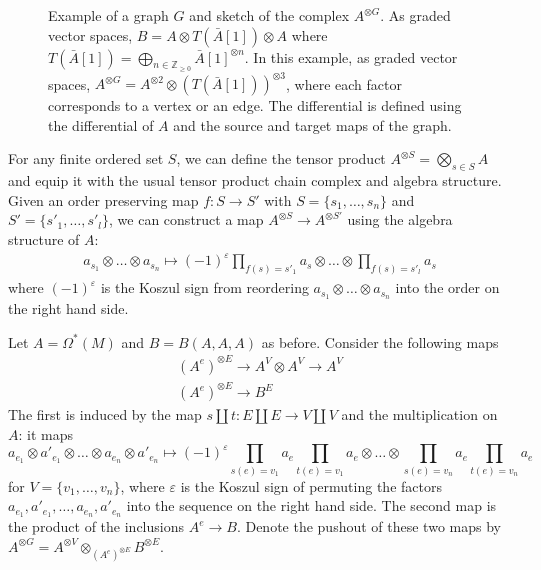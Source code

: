 \documentclass{scrartcl}
\theoremstyle{plain}
\theoremstyle{definition}
\newcommand{\Z}{\mathbb Z}
\renewcommand{\epsilon}{\varepsilon}
\renewcommand{\coprod}{\mathbin{\amalg}}
\newcommand{\Prod}{\prod}
\begin{document}
\begin{figure}[h]
    \center
    \caption{Example of a graph $G$ and sketch of the complex $A^{\otimes G}$. As graded vector spaces, $B = A\otimes T(\bar A[1])\otimes A$ where $T(\bar A[1]) = \bigoplus_{n\in \Z_{\geq 0}} \bar A[1]^{\otimes n}$. In this example, as graded vector spaces, $A^{\otimes G} = A^{\otimes 2} \otimes (T(\bar A[1]))^{\otimes 3}$, where each factor corresponds to a vertex or an edge. The differential is defined using the differential of $A$ and the source and target maps of the graph. }\label{fig:graph-model-example}
\end{figure}

For any finite ordered set $S$, we can define the tensor product $A^{\otimes S} = \bigotimes_{s\in S} A$ and equip it with the usual tensor product chain complex and algebra structure. Given an order preserving map $f\colon S\to S'$ with $S = \{s_1,\dots, s_n\}$ and $S' = \{s'_1,\dots, s'_l\}$, we can construct a map $A^{\otimes S}\to A^{\otimes S'}$ using the algebra structure of $A$:
\begin{align*}
    a_{s_1}\otimes\dots\otimes a_{s_n}\mapsto (-1)^\epsilon \Prod_{f(s) =s'_1} a_s \otimes\dots \otimes \Prod_{f(s) =s'_l} a_s
\end{align*}
where $(-1)^\epsilon$ is the Koszul sign from reordering $a_{s_1}\otimes\dots\otimes a_{s_n}$ into the order on the right hand side.

Let $A=\Omega^*(M)$ and $B = B(A, A, A)$ as before. Consider the following maps
\begin{align*}
    (A^e)^{\otimes E} \to A^V\otimes A^V\to A^V \\
    (A^e)^{\otimes E}\to B^E
\end{align*}
The first is induced by the map $s\coprod t\colon E\coprod E\to V\coprod V$ and the multiplication on $A$: it maps $$a_{e_1}\otimes a'_{e_1}\otimes\dots\otimes a_{e_n}\otimes a'_{e_n} \mapsto (-1)^\epsilon \Prod_{s(e) = v_1}a_e \Prod_{t(e) = v_1} a_e \otimes \dots\otimes \Prod_{s(e) = v_n}a_e \Prod_{t(e) = v_n} a_e$$ for $V = \{v_1,\dots, v_n\}$, where $\epsilon$ is the Koszul sign of permuting the factors $a_{e_1}, a'_{e_1}, \dots, a_{e_n}, a'_{e_n}$ into the sequence on the right hand side. The second map is the product of the inclusions $A^e\to B$. Denote the pushout of these two maps by $A^{\otimes G} = A^{\otimes V} \otimes_{(A^e)^{\otimes E}} B^{\otimes E}$.
\end{document}
